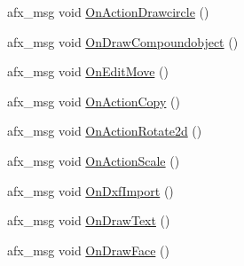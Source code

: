\begin{DoxyCompactItemize}
\item 
afx\+\_\+msg void \hyperlink{class_c_g_launcher_view_ada7fba3b088fc4dcd51769ba870fd657}{On\+Action\+Drawcircle} ()
\item 
afx\+\_\+msg void \hyperlink{class_c_g_launcher_view_ae8d1342416f65a33b83b26e03cbed051}{On\+Draw\+Compoundobject} ()
\item 
afx\+\_\+msg void \hyperlink{class_c_g_launcher_view_a7a1ccb92d7ab6cbf658300e412a96dd9}{On\+Edit\+Move} ()
\item 
afx\+\_\+msg void \hyperlink{class_c_g_launcher_view_a00e39a25f3db0a24938512aea51b0a6a}{On\+Action\+Copy} ()
\item 
afx\+\_\+msg void \hyperlink{class_c_g_launcher_view_a5b4147ec344389c1acdda33cc3bd894d}{On\+Action\+Rotate2d} ()
\item 
afx\+\_\+msg void \hyperlink{class_c_g_launcher_view_abf54ed56a602170845c286a9dcea6a01}{On\+Action\+Scale} ()
\item 
afx\+\_\+msg void \hyperlink{class_c_g_launcher_view_af40c31fdb652704134d64db8d04a7bc8}{On\+Dxf\+Import} ()
\item 
afx\+\_\+msg void \hyperlink{class_c_g_launcher_view_a079d328cea5bfe765cfe774212cc1cef}{On\+Draw\+Text} ()
\item 
afx\+\_\+msg void \hyperlink{class_c_g_launcher_view_a2e94a0b94ae7a298ad9634b1a67d2963}{On\+Draw\+Face} ()
\end{DoxyCompactItemize}
